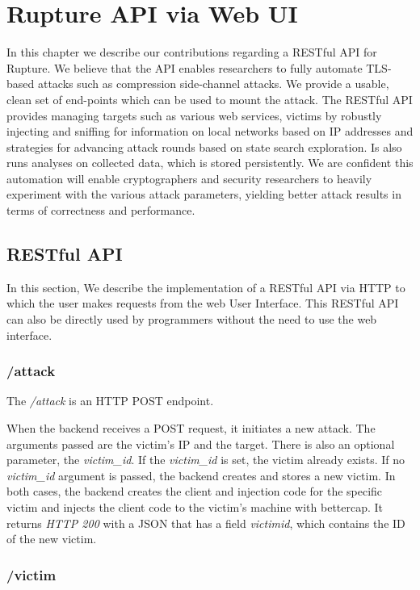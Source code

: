 \chapter{Rupture API via Web UI}\label{rupture_api}

In this chapter we describe our contributions regarding a RESTful API for Rupture.
We believe that the API enables researchers to fully automate 
TLS-based attacks such as compression side-channel attacks. We
provide a usable, clean set of end-points which can be used to mount the
attack. The RESTful API provides managing targets such as various web services,
victims by robustly injecting and sniffing for information on local networks based on IP
addresses and strategies for advancing attack rounds based on state
search exploration. Is also runs analyses on collected data, which is stored
persistently. We are confident this automation will enable cryptographers and
security researchers to heavily experiment with the various attack parameters,
yielding better attack results in terms of correctness and performance.

\section{RESTful API}
In this section, We describe the implementation of a RESTful API via HTTP 
to which the user makes requests from the web User Interface. This 
RESTful API can also be directly used by programmers without the need 
to use the web interface.

\subsection{/attack}

The \textit{/attack} is an HTTP POST endpoint. 

When the backend receives a POST request, it initiates a new attack.
The arguments passed are the victim's IP and the target. There is also an optional
parameter, the \textit{victim\_id}. If the \textit{victim\_id} is set,
the victim already exists. If no \textit{victim\_id} argument is passed, the backend 
creates and stores a new victim. In both cases, the backend
creates the client and injection code for the specific victim and 
injects the client code to the victim's machine with bettercap. 
It returns \textit{HTTP 200} with a JSON that has a 
field \textit{victimid}, which contains the ID of the new victim.

\subsection{/victim}

